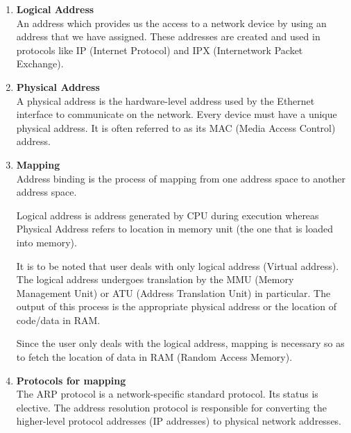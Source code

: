 \documentclass[12pt]{article}
\begin{document}
    \begin{enumerate}[label=(\alph*)]
    \item \textbf{Logical Address} \\
    An address which provides us the access to a network device by using an address that we have assigned.
    These addresses are created and used in protocols like IP (Internet Protocol) and IPX (Internetwork Packet Exchange).
     
    \item \textbf{Physical Address} \\
    A physical address is the hardware-level address used by the Ethernet interface to communicate on the network. Every device must have a unique physical address. It is often referred to as its MAC (Media Access Control) address.
    
    \item \textbf{Mapping} \\
    Address binding is the process of mapping from one address space to another address space.
    
    Logical address is address generated by CPU during execution whereas Physical Address refers to location in memory unit (the one that is loaded into memory). 
    
    It is to be noted that user deals with only logical address (Virtual address). The logical address undergoes translation by the MMU (Memory Management Unit) or ATU (Address Translation Unit) in particular. The output of this process is the appropriate physical address or the location of code/data in RAM. 
    
    Since the user only deals with the logical address, mapping is necessary so as to fetch the location of data in RAM (Random Access Memory).
    
    \item \textbf{Protocols for mapping} \\
    The ARP protocol is a network-specific standard protocol. Its status is elective. The address resolution protocol is responsible for converting the higher-level protocol addresses (IP addresses) to physical network addresses.
    \end{enumerate}
    
\end{document}
